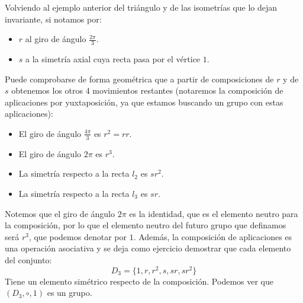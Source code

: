 \begin{ejemplo}
    Volviendo al ejemplo anterior del triángulo y de las isometrías que lo dejan invariante, si notamos por:
    \begin{itemize}
        \item $r$ al giro de ángulo $\frac{2\pi}{3}$.
        \item $s$ a la simetría axial cuya recta pasa por el vértice $1$.
    \end{itemize}
    Puede comprobarse de forma geométrica que a partir de composiciones de $r$ y de $s$ obtenemos los otros 4 movimientos restantes (notaremos la composición de aplicaciones por yuxtaposición, ya que estamos buscando un grupo con estas aplicaciones):
    \begin{itemize}
        \item El giro de ángulo $\frac{4\pi}{3}$ es $r^2 = rr$.
        \item El giro de ángulo $2\pi$ es $r^3$.
        \item La simetría respecto a la recta $l_2$ es $sr^2$.
        \item La simetría respecto a la recta $l_3$ es $sr$.
    \end{itemize}
    Notemos que el giro de ángulo $2\pi$ es la identidad, que es el elemento neutro para la composición, por lo que el elemento neutro del futuro grupo que definamos será $r^3$, que podemos denotar por $1$. Además, la composición de aplicaciones es una operación asociativa y se deja como ejercicio demostrar que cada elemento del conjunto:
    \begin{equation*}
        D_3 = \{1, r, r^2, s, sr, sr^2\}
    \end{equation*}
    Tiene un elemento simétrico respecto de la composición. Podemos ver que $(D_3,\circ,1)$ es un grupo.
\end{ejemplo}

